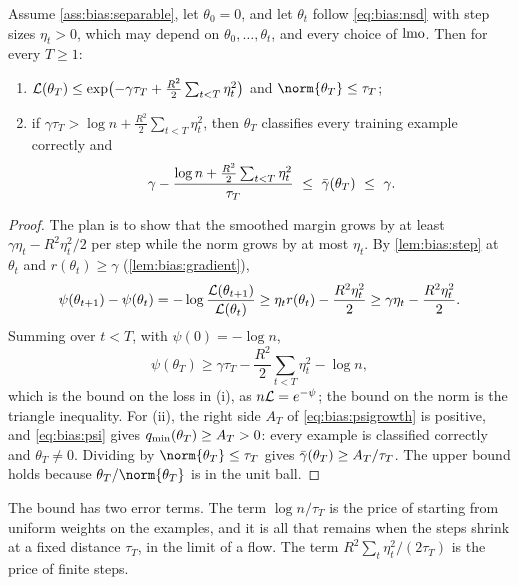 \begin{refsection}
\begin{theorem}\label{thm:bias:margin}
Assume \cref{ass:bias:separable}, let $\theta_0=0$, and let $\theta_t$ follow \eqref{eq:bias:nsd} with step sizes $\eta_t>0$, which may depend on $\theta_0,\dots,\theta_t$, and every choice of $\operatorname{lmo}$. Then for every $T\ge1$:
\begin{enumerate}
\item $\mathcal{L}(\theta_T)\le\exp\bigl(-\gamma\tau_T+\frac{R^2}2\sum_{t<T}\eta_t^2\bigr)$ and $\norm{\theta_T}\le\tau_T$;
\item if $\gamma\tau_T>\log n+\frac{R^2}2\sum_{t<T}\eta_t^2$, then $\theta_T$ classifies every training example correctly and
\begin{equation}\label{eq:bias:bound}
  \gamma-\frac{\log n+\frac{R^2}2\sum_{t<T}\eta_t^2}{\tau_T}\ \le\ \biasbar(\theta_T)\ \le\ \gamma .
\end{equation}
\end{enumerate}
\end{theorem}

\begin{proof}
The plan is to show that the smoothed margin grows by at least $\gamma\eta_t-R^2\eta_t^2/2$ per step while the norm grows by at most $\eta_t$. By \cref{lem:bias:step} at $\theta_t$ and $r(\theta_t)\ge\gamma$ (\cref{lem:bias:gradient}),
\[
  \psi(\theta_{t+1})-\psi(\theta_t)=-\log\frac{\mathcal{L}(\theta_{t+1})}{\mathcal{L}(\theta_t)}\ge\eta_tr(\theta_t)-\frac{R^2\eta_t^2}2\ge\gamma\eta_t-\frac{R^2\eta_t^2}2 .
\]
Summing over $t<T$, with $\psi(0)=-\log n$,
\begin{equation}\label{eq:bias:psigrowth}
  \psi(\theta_T)\ge\gamma\tau_T-\frac{R^2}2\sum_{t<T}\eta_t^2-\log n ,
\end{equation}
which is the bound on the loss in (i), as $n\mathcal{L}=e^{-\psi}$; the bound on the norm is the triangle inequality. For (ii), the right side $A_T$ of \eqref{eq:bias:psigrowth} is positive, and \eqref{eq:bias:psi} gives $q_{\min}(\theta_T)\ge A_T>0$: every example is classified correctly and $\theta_T\ne0$. Dividing by $\norm{\theta_T}\le\tau_T$ gives $\bar\gamma(\theta_T)\ge A_T/\tau_T$. The upper bound holds because $\theta_T/\norm{\theta_T}$ is in the unit ball.
\end{proof}

The bound has two error terms. The term $\log n/\tau_T$ is the price of starting from uniform weights on the examples, and it is all that remains when the steps shrink at a fixed distance $\tau_T$, in the limit of a flow. The term $R^2\sum_t\eta_t^2/(2\tau_T)$ is the price of finite steps.


\end{refsection}
